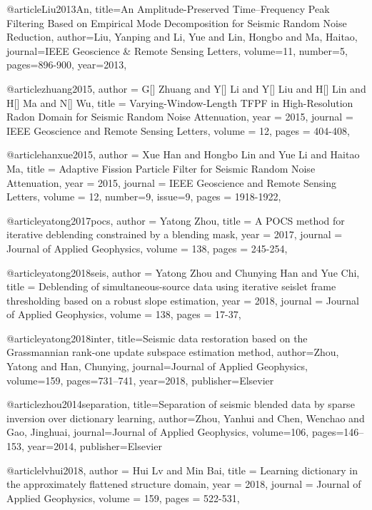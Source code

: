 @article{Liu2013An,
  title={An Amplitude-Preserved Time–Frequency Peak Filtering Based on Empirical Mode Decomposition for Seismic Random Noise Reduction},
  author={Liu, Yanping and Li, Yue and Lin, Hongbo and Ma, Haitao},
  journal={IEEE Geoscience \& Remote Sensing Letters},
  volume={11},
  number={5},
  pages={896-900},
  year={2013},
}

@article{zhuang2015,
  author =	 {G[] Zhuang and Y[] Li and Y[] Liu and H[] Lin and H[] Ma and N[] Wu},
  title =	 {Varying-Window-Length {TFPF} in High-Resolution Radon Domain for Seismic Random Noise Attenuation},
  year =	 2015,
  journal =	 {IEEE Geoscience and Remote Sensing Letters},
  volume =	 12,
  pages =	 {404-408},
}

@article{hanxue2015,
  author =	 {Xue Han and Hongbo Lin and Yue Li and Haitao Ma},
  title =	 {Adaptive Fission Particle Filter for Seismic Random Noise Attenuation},
  year =	 2015,
  journal =	 {IEEE Geoscience and Remote Sensing Letters},
  volume =	 12,
  number=9,
  issue=9,
  pages =	 {1918-1922},
}

@article{yatong2017pocs,
  author =	 {Yatong Zhou},
  title =	 {A {POCS} method for iterative deblending constrained by a blending mask},
  year =	 2017,
  journal =	 {Journal of Applied Geophysics},
  volume =	 138,
  pages =	 {245-254},
}

@article{yatong2018seis,
  author =	 {Yatong Zhou and Chunying Han and Yue Chi},
  title =	 {Deblending of simultaneous-source data using iterative seislet frame thresholding based on a robust slope estimation},
  year =	 2018,
  journal =	 {Journal of Applied Geophysics},
  volume =	 138,
  pages =	 {17-37},
}

@article{yatong2018inter,
  title={Seismic data restoration based on the Grassmannian rank-one update subspace estimation method},
  author={Zhou, Yatong and Han, Chunying},
  journal={Journal of Applied Geophysics},
  volume={159},
  pages={731--741},
  year={2018},
  publisher={Elsevier}
}

@article{zhou2014separation,
  title={Separation of seismic blended data by sparse inversion over dictionary learning},
  author={Zhou, Yanhui and Chen, Wenchao and Gao, Jinghuai},
  journal={Journal of Applied Geophysics},
  volume={106},
  pages={146--153},
  year={2014},
  publisher={Elsevier}
}

@article{lvhui2018,
  author =	 {Hui Lv and Min Bai},
  title =	 {Learning dictionary in the approximately flattened structure domain},
  year =	 2018,
  journal =	 {Journal of Applied Geophysics},
  volume =	 159,
  pages =	 {522-531},
}

